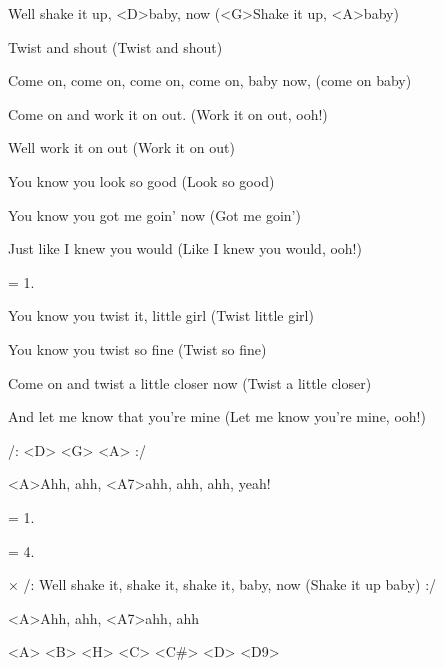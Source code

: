 

\zs
Well shake it up, <D>baby, now (<G>Shake it up, <A>baby)

Twist and shout (Twist and shout)

Come on, come on, come on, come on, baby now, (come on baby)

Come on and work it on out. (Work it on out, ooh!)
\ks

\zs
Well work it on out (Work it on out)

You know you look so good (Look so good)

You know you got me goin' now (Got me goin')

Just like I knew you would (Like I knew you would, ooh!)
\ks

\zs
= 1.
\ks

\zs
You know you twist it, little girl (Twist little girl)

You know you twist so fine (Twist so fine)

Come on and twist a little closer now (Twist a little closer)

And let me know that you're mine (Let me know you're mine, ooh!)
\ks

/: <D> <G> <A> :/

<A>Ahh, ahh, <A7>ahh, ahh, ahh, yeah!

\zs
= 1.
\ks

\zs
= 4.
\ks

× /: Well shake it, shake it, shake it, baby, now (Shake it up baby) :/
\ks

<A>Ahh, ahh, <A7>ahh, ahh

<A> <B> <H> <C> <C#> <D> <D9>

\kp
